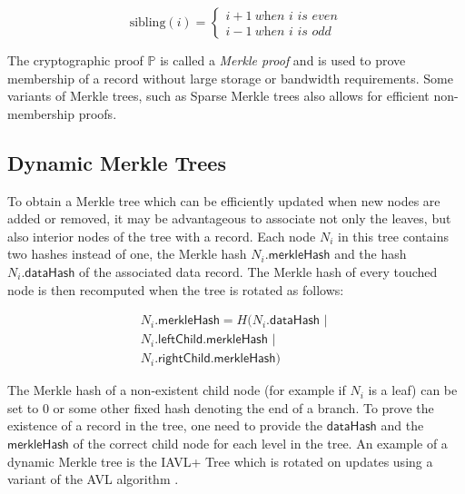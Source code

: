 \documentclass{style/kththesis}
\begin{document}
\[
  \text{sibling}(i)=\begin{cases}
               i + 1 ~\textit{when i is even}\\
               i - 1 ~\textit{when i is odd}
            \end{cases}
\]

The cryptographic proof $\mathbb{P}$ is called a \textit{Merkle proof} and is used to prove membership of a record without large storage or bandwidth requirements. Some variants of Merkle trees, such as Sparse Merkle trees \cite{Dahlberg16} also allows for efficient non-membership proofs.

\subsection{Dynamic Merkle Trees}
\label{sec:dyn-merkle}
To obtain a Merkle tree which can be efficiently updated when new nodes are added or removed, it may be advantageous to associate not only the leaves, but also interior nodes of the tree with a record. Each node $N_i$ in this tree contains two hashes instead of one, the Merkle hash $N_i.\mathsf{merkleHash}$ and the hash $N_i.\mathsf{dataHash}$ of the associated data record. The Merkle hash of every touched node is then recomputed when the tree is rotated as follows:

\begin{equation}
\begin{split}
    N_i{\mathsf{.merkleHash}} = H(N_i\mathsf{.dataHash} \text{ | } \\ N_i\mathsf{.leftChild.merkleHash} \text{ | } \\ N_i\mathsf{.rightChild.merkleHash})
    \end{split}
\end{equation}

The Merkle hash of a non-existent child node (for example if $N_i$ is a leaf) can be set to $0$ or some other fixed hash denoting the end of a branch. To prove the existence of a record in the tree, one need to provide the $\mathsf{dataHash}$ and the $\mathsf{merkleHash}$ of the correct child node for each level in the tree. An example of a dynamic Merkle tree is the IAVL+ Tree which is rotated on updates using a variant of the AVL algorithm \cite{Tendermint15}.
\end{document}
